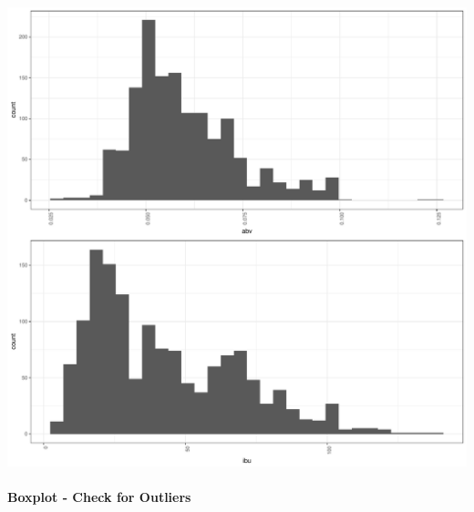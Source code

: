 \documentclass[]{article}
\let\oldparagraph\paragraph
\renewcommand{\paragraph}[1]{\oldparagraph{#1}\mbox{}}
\begin{document}
\begin{center}\includegraphics{Analysis_Final_files/figure-latex/unnamed-chunk-24-1} \end{center}

\paragraph{Boxplot - Check for
Outliers}\label{boxplot---check-for-outliers}
\end{document}
